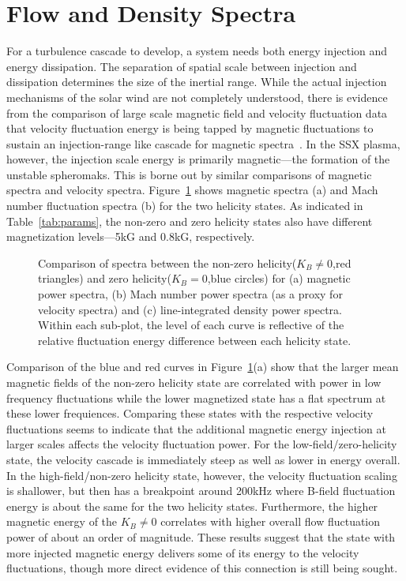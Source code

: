 \documentclass[preprint2]{aastex}
\begin{document}
\section{Flow and Density Spectra}\label{sec:flowdens}

For a turbulence cascade to develop, a system needs both energy injection and energy dissipation. The separation of spatial scale between injection and dissipation determines the size of the inertial range. While the actual injection mechanisms of the solar wind are not completely understood, there is evidence from the comparison of large scale magnetic field and velocity fluctuation data that velocity fluctuation energy is being tapped by magnetic fluctuations to sustain an injection-range like cascade for magnetic spectra~\citep{rob10}. In the SSX plasma, however, the injection scale energy is primarily magnetic---the formation of the unstable spheromaks. This is borne out by similar comparisons of magnetic spectra and velocity spectra. Figure~\ref{fig:BvsFlow} shows magnetic spectra (a) and Mach number fluctuation spectra (b) for the two helicity states. As indicated in Table~\ref{tab:params}, the non-zero and zero helicity states also have different magnetization levels---5kG and 0.8kG, respectively.

\begin{figure}
\caption{\label{fig:BvsFlow} Comparison of spectra between the non-zero helicity($K_{B}\neq 0$,red triangles) and zero helicity($K_{B}=0$,blue circles) for (a) magnetic power spectra, (b) Mach number power spectra (as a proxy for velocity spectra) and (c) line-integrated density power spectra. Within each sub-plot, the level of each curve is reflective of the relative fluctuation energy difference between each helicity state.}
\end{figure}

Comparison of the blue and red curves in Figure~\ref{fig:BvsFlow}(a) show that the larger mean magnetic fields of the non-zero helicity state are correlated with power in low frequency fluctuations while the lower magnetized state has a flat spectrum at these lower frequiences. Comparing these states with the respective velocity fluctuations seems to indicate that the additional magnetic energy injection at larger scales affects the velocity fluctuation power. For the low-field/zero-helicity state, the velocity cascade is immediately steep as well as lower in energy overall. In the high-field/non-zero helicity state, however, the velocity fluctuation scaling is shallower, but then has a breakpoint around 200kHz where B-field fluctuation energy is about the same for the two helicity states. Furthermore, the higher magnetic energy of the $K_{B}\neq 0$ correlates with higher overall flow fluctuation power of about an order of magnitude. These results suggest that the state with more injected magnetic energy delivers some of its energy to the velocity fluctuations, though more direct evidence of this connection is still being sought.
\end{document}
